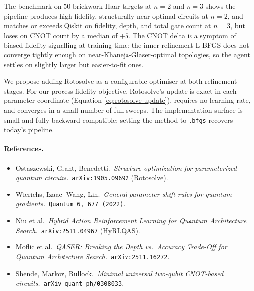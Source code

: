 \documentclass[11pt,a4paper]{article}
\begin{document}
The benchmark on $50$ brickwork-Haar targets at $n = 2$ and $n = 3$
shows the pipeline produces high-fidelity, structurally-near-optimal
circuits at $n = 2$, and matches or exceeds Qiskit on fidelity, depth,
and total gate count at $n = 3$, but loses on CNOT count by a median
of $+5$. The CNOT delta is a symptom of biased fidelity signalling at
training time: the inner-refinement L-BFGS does not converge tightly
enough on near-Khaneja-Glaser-optimal topologies, so the agent settles
on slightly larger but easier-to-fit ones.

We propose adding Rotosolve as a configurable optimiser at both
refinement stages. For our process-fidelity objective, Rotosolve's
update is exact in each parameter coordinate (Equation
\ref{eq:rotosolve-update}), requires no learning rate, and converges in
a small number of full sweeps. The implementation surface is small and
fully backward-compatible: setting the method to \texttt{lbfgs}
recovers today's pipeline.

\paragraph{References.}
\begin{itemize}[leftmargin=2em]
\item Ostaszewski, Grant, Benedetti.\ \emph{Structure optimization for parameterized quantum circuits.}\ \texttt{arXiv:1905.09692} (Rotosolve).
\item Wierichs, Izaac, Wang, Lin.\ \emph{General parameter-shift rules for quantum gradients.}\ \texttt{Quantum 6, 677 (2022)}.
\item Niu et al.\ \emph{Hybrid Action Reinforcement Learning for Quantum Architecture Search.}\ \texttt{arXiv:2511.04967} (HyRLQAS).
\item Moflic et al.\ \emph{QASER: Breaking the Depth vs.\ Accuracy Trade-Off for Quantum Architecture Search.}\ \texttt{arXiv:2511.16272}.
\item Shende, Markov, Bullock.\ \emph{Minimal universal two-qubit CNOT-based circuits.}\ \texttt{arXiv:quant-ph/0308033}.
\end{itemize}
\end{document}
